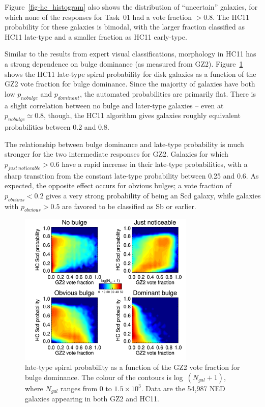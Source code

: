 \documentclass[useAMS,usenatbib]{mn2e}
\begin{document}
Figure~\ref{fig-hc_histogram} also shows the distribution of ``uncertain'' galaxies, for which none of the responses for Task~01 had a vote fraction $>0.8$. The HC11 probability for these galaxies is bimodal, with the larger fraction classified as HC11 late-type and a smaller fraction as HC11 early-type. 

Similar to the results from expert visual classifications, morphology in HC11 has a strong dependence on bulge dominance (as measured from GZ2). Figure~\ref{fig-hc_gz2_bulge_contour} shows the HC11 late-type spiral probability for disk galaxies as a function of the GZ2 vote fraction for bulge dominance. Since the majority of galaxies have both low $p_{no bulge}$ and $p_{dominant}$, the automated probabilities are primarily flat. There is a slight correlation between no bulge and later-type galaxies -- even at $p_{no bulge}\simeq0.8$, though, the HC11 algorithm gives galaxies roughly equivalent probabilities between 0.2 and 0.8. 

The relationship between bulge dominance and late-type probability is much stronger for the two intermediate responses for GZ2. Galaxies for which $p_{just~noticeable}>0.6$ have a rapid increase in their late-type probabilities, with a sharp transition from the constant late-type probability between 0.25 and 0.6. As expected, the opposite effect occurs for obvious bulges; a vote fraction of $p_{obvious}<0.2$ gives a very strong probability of being an Scd galaxy, while galaxies with $p_{obvious}>0.5$ are favored to be classified as Sb or earlier. 

\begin{figure}
\includegraphics[angle=0,width=3.3in]{figures/hc_gz2_bulge_contour.pdf}
\caption{\citet{hue11} late-type spiral probability as a function of the GZ2 vote fraction for bulge dominance. The colour of the contours is log~$(N_{gal} + 1)$, where $N_{gal}$ ranges from 0 to $1.5\times10^3$. Data are the 54,987 NED galaxies appearing in both GZ2 and HC11.
\label{fig-hc_gz2_bulge_contour}}
\end{figure}
\end{document}
